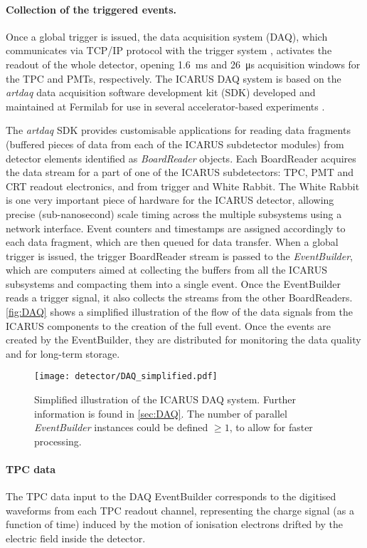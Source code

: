 \paragraph{Collection of the triggered events. } Once a global trigger is issued, the data acquisition system (DAQ), which communicates via TCP/IP protocol with the trigger system \cite{ICARUS:2025kai}, activates the readout of the whole detector, opening \SI{1.6}{\ms} and \SI{26}{\us} acquisition windows for the TPC and PMTs, respectively. The ICARUS DAQ system is based on the \emph{artdaq} data acquisition software development kit (SDK) developed and maintained at Fermilab for use in several accelerator-based experiments \cite{Biery:2013cda}.  

The \emph{artdaq} SDK provides  customisable applications for reading data fragments (buffered pieces of data from each of the ICARUS subdetector modules) from detector elements identified as \emph{BoardReader} objects. Each BoardReader acquires the data stream for a part of one of the ICARUS subdetectors: TPC, PMT and CRT readout electronics, and from trigger and White Rabbit. 
The White Rabbit is one very important piece of hardware for the ICARUS detector, allowing precise (sub-nanosecond) scale timing across the multiple subsystems using a network interface. 
Event counters and timestamps are assigned accordingly to each data fragment, which are then queued for data transfer. 
When a global trigger is issued, the trigger BoardReader stream is passed to the \emph{EventBuilder}, which are computers aimed at collecting the buffers from all the ICARUS subsystems and compacting them into a single event. Once the EventBuilder reads a trigger signal, it also collects the streams from the other BoardReaders.  \autoref{fig:DAQ} shows a simplified illustration of the flow of the data signals from the ICARUS components to the creation of the full event. Once the events are created by the EventBuilder, they are distributed for monitoring the data quality and for long-term storage. 

\begin{figure}
    \centering
    \texttt{[image: detector/DAQ\_simplified.pdf]}
    \caption[ICARUS DAQ illustration]{Simplified illustration of the ICARUS DAQ system. Further information is found in \autoref{sec:DAQ}. The number of parallel \emph{EventBuilder} instances could be defined $\geq1$, to allow for faster processing.}
    \label{fig:DAQ}
\end{figure}

\paragraph{TPC data} The TPC data input to the DAQ EventBuilder corresponds to the digitised waveforms from each TPC readout channel, representing the charge signal (as a function of time) induced by the motion of ionisation electrons drifted by the electric field inside the detector. 

